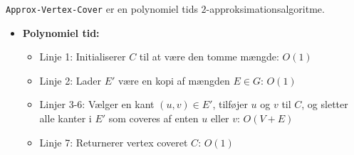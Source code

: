 \begin{frame}[allowframebreaks]
\begin{theorem}
\texttt{Approx-Vertex-Cover} er en polynomiel tids $2$-approksimationsalgoritme.
\end{theorem}
\begin{itemize}
  \item \textbf{Polynomiel tid:}
        \begin{itemize}
          \item Linje 1: Initialiserer $C$ til at være den tomme mængde: $O(1)$
          \item Linje 2: Lader $E'$ være en kopi af mængden $E \in G$: $O(1)$
          \item Linjer 3-6: Vælger en kant $(u,v) \in E'$, tilføjer $u$ og $v$ til $C$, og sletter alle kanter i $E'$ som coveres af enten $u$ eller $v$: $O(V+E)$
          \item Linje 7: Returnerer vertex coveret $C$: $O(1)$
        \end{itemize}


\end{itemize}
\end{frame}
